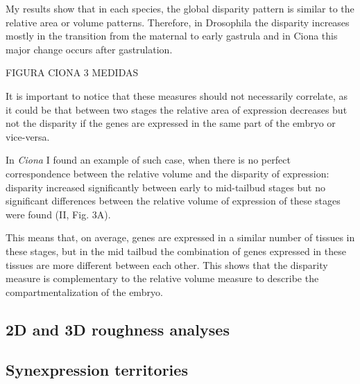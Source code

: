 My results show that in each species, the global disparity pattern is similar to the relative area or volume patterns.
Therefore, in Drosophila the disparity increases mostly in the transition from the maternal to early gastrula and in Ciona this major change occurs after gastrulation.

FIGURA CIONA 3 MEDIDAS

It is important to notice that these measures should not necessarily correlate, as it could be that between two stages the relative area of expression decreases but not the disparity if the genes are expressed in the same part of the embryo or vice-versa.

In \textit{Ciona} I found an example of such case, when there is no perfect correspondence between the relative volume and the disparity of expression: disparity increased significantly between early to mid-tailbud stages but no significant differences between the relative volume of expression of these stages were found (II, Fig. 3A).

This means that, on average, genes are expressed in a similar number of tissues in these stages, but in the mid tailbud the combination of genes expressed in these tissues are more different between each other. This shows that the disparity measure is complementary to the relative volume measure to describe the compartmentalization of the embryo.


\subsection{2D and 3D roughness analyses}




\subsection{Synexpression territories}
